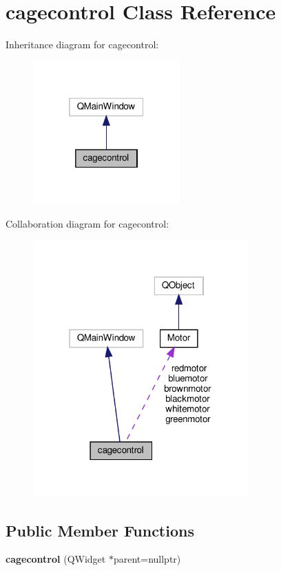 \hypertarget{classcagecontrol}{}\section{cagecontrol Class Reference}
\label{classcagecontrol}


Inheritance diagram for cagecontrol\+:
\nopagebreak
\begin{figure}[H]
\begin{center}
\leavevmode
\includegraphics[width=160pt]{classcagecontrol__inherit__graph}
\end{center}
\end{figure}


Collaboration diagram for cagecontrol\+:
\nopagebreak
\begin{figure}[H]
\begin{center}
\leavevmode
\includegraphics[width=235pt]{classcagecontrol__coll__graph}
\end{center}
\end{figure}
\subsection*{Public Member Functions}
\begin{DoxyCompactItemize}
\item 
\mbox{\label{classcagecontrol_a6630362ef3dd621859126e357e545dd5}} 
{\bfseries cagecontrol} (Q\+Widget $\ast$parent=nullptr)
\end{DoxyCompactItemize}

